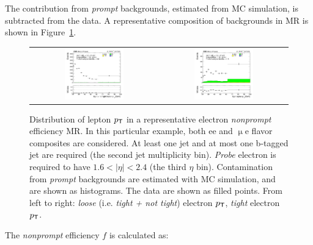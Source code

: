 The contribution from \emph{prompt} backgrounds, estimated from \ac{MC} simulation, is subtracted from the data. A representative composition of backgrounds in \ac{MR} is shown in Figure~\ref{fig:MRexample}. 

\begin{figure}[tbh!]
 \begin{center}
 \begin{tabular}{cc}
 \includegraphics[width=0.48\textwidth]{figures/Part3/Nonprompt/MR/FlepPt}&
 \includegraphics[width=0.48\textwidth]{figures/Part3/Nonprompt/MR/TlepPt} \\
 \end{tabular}
 \caption{Distribution of lepton $p_{\textsf{T}}$ in a representative electron \emph{nonprompt} efficiency \ac{MR}. In this particular example, both ee and $\upmu$e flavor composites are considered. At least one jet and at most one b-tagged jet are required (the second jet multiplicity bin). \emph{Probe} electron is required to have $1.6<|\eta|<2.4$ (the third $\eta$ bin). Contamination from \emph{prompt} backgrounds are estimated with \ac{MC} simulation, and are shown as histograms. The data are shown as filled points. From left to right: \emph{loose} (i.e. \emph{tight + not tight}) electron $p_{\textsf{T}}$, \emph{tight} electron $p_{\textsf{T}}$.}
 \label{fig:MRexample}
 \end{center}
\end{figure}

The \emph{nonprompt} efficiency $f$ is calculated as:

